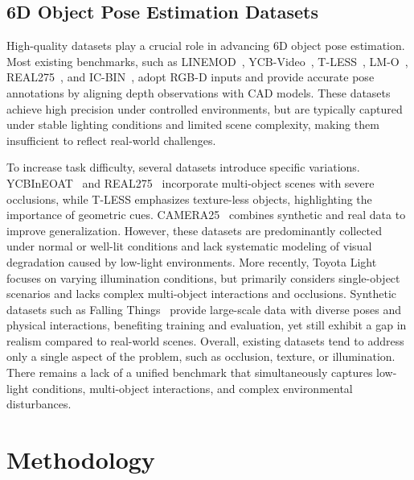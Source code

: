 \documentclass[letterpaper, 10 pt, journal, twoside]{IEEEtran}  %
\begin{document}
 
 
 \subsection{6D Object Pose Estimation Datasets}
 High-quality datasets play a crucial role in advancing 6D object pose estimation. 
 Most existing benchmarks, such as LINEMOD~\cite{hinterstoisser2012model}, YCB-Video~\cite{xiang2017posecnn}, T-LESS~, LM-O~\cite{brachmann2014learning}, REAL275~\cite{wang2019normalized}, and IC-BIN~\cite{kleeberger2019large}, adopt RGB-D inputs and provide accurate pose annotations by aligning depth observations with CAD models. 
 These datasets achieve high precision under controlled environments, but are typically captured under stable lighting conditions and limited scene complexity, making them insufficient to reflect real-world challenges.
 
 To increase task difficulty, several datasets introduce specific variations. 
 YCBInEOAT~\cite{wen2020se} and REAL275~\cite{wang2019normalized} incorporate multi-object scenes with severe occlusions, while T-LESS emphasizes texture-less objects, highlighting the importance of geometric cues. 
 CAMERA25~\cite{lee2021category} combines synthetic and real data to improve generalization. 
 However, these datasets are predominantly collected under normal or well-lit conditions and lack systematic modeling of visual degradation caused by low-light environments.
 More recently, Toyota Light~\cite{hodan2018bop} focuses on varying illumination conditions, but primarily considers single-object scenarios and lacks complex multi-object interactions and occlusions. 
 Synthetic datasets such as Falling Things~\cite{fallingthings} provide large-scale data with diverse poses and physical interactions, benefiting training and evaluation, yet still exhibit a gap in realism compared to real-world scenes.
 Overall, existing datasets tend to address only a single aspect of the problem, such as occlusion, texture, or illumination. 
 There remains a lack of a unified benchmark that simultaneously captures low-light conditions, multi-object interactions, and complex environmental disturbances.

\section{Methodology}
\end{document}
